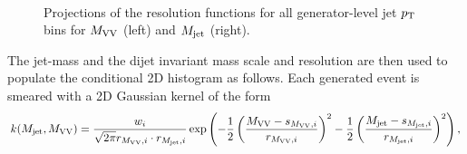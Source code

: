 \begin{figure}[h!]
\centering
{}
\\
\caption{Projections of the resolution functions for all generator-level jet $p_{\mathrm{T}}$ bins for $M_{\rm VV}$ (left) and $M_{\rm jet}$ (right).}
\label{fig:ResolutionProfiles}
\end{figure}
The jet-mass and the dijet invariant mass scale and resolution are then used to populate the conditional 2D histogram as follows. Each generated event is smeared with a 2D Gaussian kernel of the form
\begin{equation}
k(M_{\rm jet},M_{\rm VV}) =\frac{w_i}{\sqrt{2\pi}r_{M_{\rm VV},i}\cdot r_{M_{\rm jet},i}} \exp \left (-\frac{1}{2} \left ( \frac{M_{\rm VV}-s_{M_{\rm VV},i}}{r_{M_{\rm VV},i}} \right)^2 -\frac{1}{2} \left ( \frac{M_{\rm jet}-s_{M_{\rm jet},i}}{r_{M_{\rm jet},i}} \right)^2 \right ),   
\end{equation}
